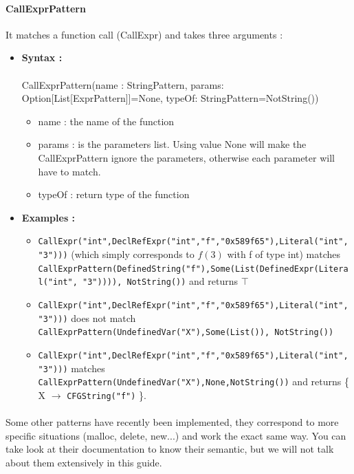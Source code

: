 \documentclass{report}
\begin{document}
\paragraph{CallExprPattern}
It matches a function call (CallExpr) and takes three arguments : 
\begin{itemize}
	\item{\textbf{Syntax : }} ~\\~\\
		CallExprPattern(name : StringPattern, params: Option[List[ExprPattern]]=None, typeOf: StringPattern=NotString()) 
	\begin{itemize}
		\item name : the name of the function
		\item params : is the parameters list. Using value None will make the CallExprPattern ignore the parameters, otherwise each parameter will have to match.
		\item typeOf : return type of the function
	\end{itemize}
	\item{\textbf{Examples :}}
	\begin{itemize}
        	\item{}\lstinline|CallExpr("int",DeclRefExpr("int","f","0x589f65"),Literal("int","3")))| (which simply corresponds to $f(3)$ with f of type int) matches \lstinline|CallExprPattern(DefinedString("f"),Some(List(DefinedExpr(Literal("int", "3")))), NotString())| and returns $\top$
		\item{}\lstinline|CallExpr("int",DeclRefExpr("int","f","0x589f65"),Literal("int","3")))| does not match \lstinline|CallExprPattern(UndefinedVar("X"),Some(List()), NotString())| 
		\item{}\lstinline|CallExpr("int",DeclRefExpr("int","f","0x589f65"),Literal("int","3")))| matches \lstinline|CallExprPattern(UndefinedVar("X"),None,NotString())| and returns  \{ X $\rightarrow$ \lstinline|CFGString("f")| \}.
	\end{itemize}
\end{itemize}

\paragraph{}
\hspace{4mm}Some other patterns have recently been implemented, they correspond to more specific situations (malloc, delete, new...) and work the exact same way.
You can take look at their documentation to know their semantic, but we will not talk about them extensively in this guide.
\end{document}
